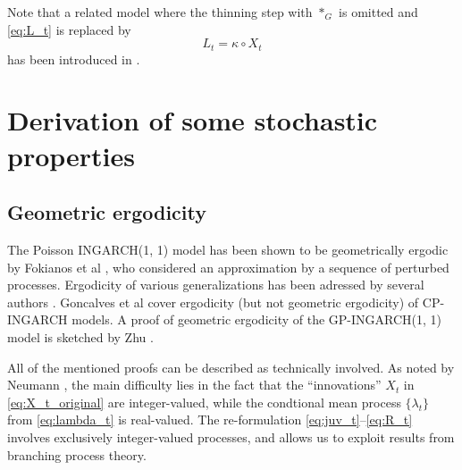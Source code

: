 \documentclass[review]{elsarticle}
\begin{document}
Note that a related model where the thinning step with $*_G$ is omitted and \eqref{eq:L_t} is replaced by
$$
L_t = \kappa \circ X_t
$$ 
has been introduced in \cite{Bracher2019}.

\section{Derivation of some stochastic properties}

\subsection{Geometric ergodicity}

The Poisson INGARCH(1, 1) model has been shown to be geometrically ergodic by Fokianos et al \cite{Fokianos2009}, who considered an approximation by a sequence of perturbed processes. Ergodicity of various generalizations has been adressed by several authors \citep{Davis2016, Douc2013, Neumann2011}. Goncalves et al \citep{Goncalves2015} cover ergodicity (but not geometric ergodicity) of CP-INGARCH models. A proof of geometric ergodicity of the GP-INGARCH(1, 1) model is sketched by Zhu \citep{Zhu2012}. %

All of the mentioned proofs can be described as technically involved. As noted by Neumann \cite{Neumann2011}, the main difficulty lies in the fact that the ``innovations'' $X_t$ in \eqref{eq:X_t_original} are integer-valued, while the condtional mean process $\{\lambda_t\}$ from \eqref{eq:lambda_t} is real-valued. The re-formulation \eqref{eq:juv_t}--\eqref{eq:R_t} involves exclusively integer-valued processes, and allows us to exploit results from branching process theory.
\end{document}
